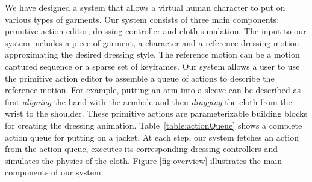 We have designed a system that allows a virtual human character to put
on various types of garments. Our system consists of three main
components: primitive action editor, dressing controller and cloth
simulation. The input to our system includes a piece of garment, a
character and a reference dressing motion approximating the desired
dressing style. The reference motion can be a motion captured sequence
or a sparse set of keyframes. Our system allows a user to use the primitive
action editor to assemble a queue of actions to describe the reference
motion.  For example, putting an arm into a sleeve can be described as first \emph{aligning} the hand with the armhole and then \emph{dragging} the cloth from the wrist to the shoulder. These primitive actions are parameterizable building blocks for creating the dressing animation. Table~\ref{table:actionQueue} shows a complete action queue for putting on a jacket. At each step, our system fetches an action from the action queue, executes its corresponding dressing controllers and simulates the physics of the cloth. Figure \ref{fig:overview} illustrates the main components of our system. 


